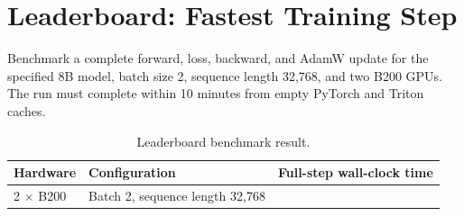 \section{Leaderboard: Fastest Training Step}
\label{sec:leaderboard}


Benchmark a complete forward, loss, backward, and AdamW update for the specified 8B model, batch size 2, sequence length 32,768, and two B200 GPUs. The run must complete within 10 minutes from empty PyTorch and Triton caches.


\begin{table}[htbp]
\centering\small
\begin{tabular}{@{}llr@{}}
\toprule
Hardware & Configuration & Full-step wall-clock time \\
\midrule
2 $\times$ B200 & Batch 2, sequence length 32{,}768 & \\
\bottomrule
\end{tabular}
\caption{Leaderboard benchmark result.}
\label{tab:leaderboard}
\end{table}

\answer
